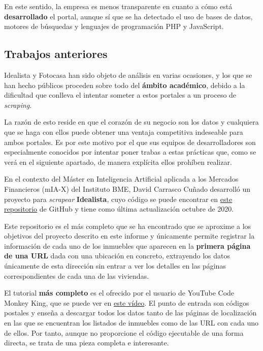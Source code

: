 \documentclass[12pt]{article}
\begin{document}
En este sentido, la empresa es menos transparente en cuanto a cómo está \textbf{desarrollado} el portal, aunque sí que se ha detectado el uso de bases de datos, motores de búsquedas y lenguajes de programación PHP y JavaScript.

\vspace{-1.5em}\subsection*{Trabajos anteriores}\vspace{-1.0em}

Idealista y Fotocasa han sido objeto de análisis en varias ocasiones, y los que se han hecho públicos proceden sobre todo del \textbf{ámbito académico}, debido a la dificultad que conlleva el intentar someter a estos portales a un proceso de \textit{scraping}.

La razón de esto reside en que el corazón de su negocio son los datos y cualquiera que se haga con ellos puede obtener una ventaja competitiva indeseable para ambos portales. Es por este motivo por el que sus equipos de desarrolladores son especialmente conocidos por intentar poner trabas a estas prácticas que, como se verá en el siguiente apartado, de manera explícita ellos prohíben realizar.

En el contexto del Máster en Inteligencia Artificial aplicada a los Mercados Financieros (mIA-X) del Instituto BME, David Carrasco Cuñado desarrolló un proyecto para \textit{scrapear} \textbf{Idealista}, cuyo código se puede encontrar en \href{https://github.com/David-Carrasco/Scrapy-Idealista}{este repositorio} de GitHub y tiene como última actualización octubre de 2020. 

Este repositorio es el más completo que se ha encontrado que se aproxime a los objetivos del proyecto descrito en este informe y únicamente permite registrar la información de cada uno de los inmuebles que aparecen en la \textbf{primera página de una URL} dada con una ubicación en concreto, extrayendo los datos únicamente de esta dirección sin entrar a ver los detalles en las páginas correspondientes de cada una de las viviendas. 

El tutorial \textbf{más completo} es el ofrecido por el usuario de YouTube Code Monkey King, que se puede ver en \href{https://www.youtube.com/watch?v=4Tv73KuqgVo}{este vídeo}. El punto de entrada son códigos postales y enseña a descargar todos los datos tanto de las páginas de localización en las que se encuentran los listados de inmuebles como de las URL con cada uno de ellos. Por tanto, aunque no proporcione el código ejecutable de una forma directa, se trata de una pieza completa e interesante. 
\end{document}
